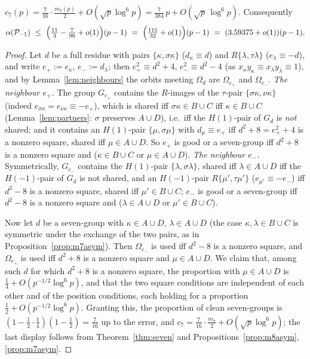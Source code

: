 \begin{proposition}\label{prop:clean}
$c_7(p)=\tfrac7{16}\cdot\tfrac{m_7(p)}2+O(\sqrt p\log^6p)=\tfrac{7}{384}\,p+O(\sqrt p\,\log^6p)$.  Consequently
\[
 \alpha(\Pset_{-1})\ \le\ \Bigl(\tfrac{11}3-\tfrac7{96}+o(1)\Bigr)(p-1)\ =\ \Bigl(\tfrac{115}{32}+o(1)\Bigr)(p-1)\ =\ (3.59375+o(1))(p-1).
\]
\end{proposition}
\begin{proof}
Let $d$ be a full residue with pairs $\{\kappa,\sigma\kappa\}$ ($d_\kappa\equiv d$) and $R\{\lambda,\tau\lambda\}$ ($e_\lambda\equiv-d$), and write
$e_+:=e_\kappa$, $e_-:=d_\lambda$; then $e_+^2\equiv d^2+4$, $e_-^2\equiv d^2-4$ (as $x_\kappa y_\kappa\equiv x_\lambda y_\lambda\equiv1$), and by
Lemma~\ref{lem:neighbours} the orbits meeting $\Omega_d$ are $\Omega_{e_+}$ and $\Omega_{e_-}$.  \emph{The neighbour $e_+$.}  The group
$G_{e_+}$ contains the $R$-images of the $\tau$-pair $\{\sigma\kappa,\nu\kappa\}$ (indeed $e_{\sigma\kappa}=e_{\nu\kappa}\equiv-e_+$), which is
shared iff $\sigma\kappa\in B\cup C$ iff $\kappa\in B\cup C$ (Lemma~\ref{lem:partners}: $\sigma$ preserves $A\cup D$), i.e.\ iff the $H(1)$-pair
of $G_d$ is \emph{not} shared; and it contains an $H(1)$-pair $\{\mu,\sigma\mu\}$ with $d_\mu\equiv e_+$ iff $d^2+8=e_+^2+4$ is a nonzero
square, shared iff $\mu\in A\cup D$.  So $e_+$ is good or a seven-group iff $d^2+8$ is a nonzero square and ($\kappa\in B\cup C$ or
$\mu\in A\cup D$).  \emph{The neighbour $e_-$.}  Symmetrically, $G_{e_-}$ contains the $H(1)$-pair $\{\lambda,\sigma\lambda\}$, shared iff
$\lambda\in A\cup D$ iff the $H(-1)$-pair of $G_d$ is not shared, and an $H(-1)$-pair $R\{\mu',\tau\mu'\}$ ($e_{\mu'}\equiv-e_-$) iff
$d^2-8$ is a nonzero square, shared iff $\mu'\in B\cup C$; $e_-$ is good or a seven-group iff $d^2-8$ is a nonzero square and
($\lambda\in A\cup D$ or $\mu'\in B\cup C$).

Now let $d$ be a seven-group with $\kappa\in A\cup D$, $\lambda\in A\cup D$ (the case $\kappa,\lambda\in B\cup C$ is symmetric under the
exchange of the two pairs, as in Proposition~\ref{prop:m7asym}).  Then $\Omega_{e_-}$ is used iff $d^2-8$ is a nonzero square, and
$\Omega_{e_+}$ is used iff $d^2+8$ is a nonzero square and $\mu\in A\cup D$.  We claim that, among such $d$ for which $d^2+8$ is a nonzero square, the proportion with
$\mu\in A\cup D$ is $\tfrac14+O(p^{-1/2}\log^6p)$, and that the two square conditions are independent of each other and of the position
conditions, each holding for a proportion $\tfrac12+O(p^{-1/2}\log^6p)$.  Granting this, the proportion of clean seven-groups is
$(1-\tfrac12\cdot\tfrac14)(1-\tfrac12)=\tfrac7{16}$ up to the error, and $c_7=\tfrac7{16}\cdot\tfrac{m_7}2+O(\sqrt p\log^6p)$; the last
display follows from Theorem~\ref{thm:seven} and Propositions~\ref{prop:m8asym}, \ref{prop:m7asym}.


\end{proof}
